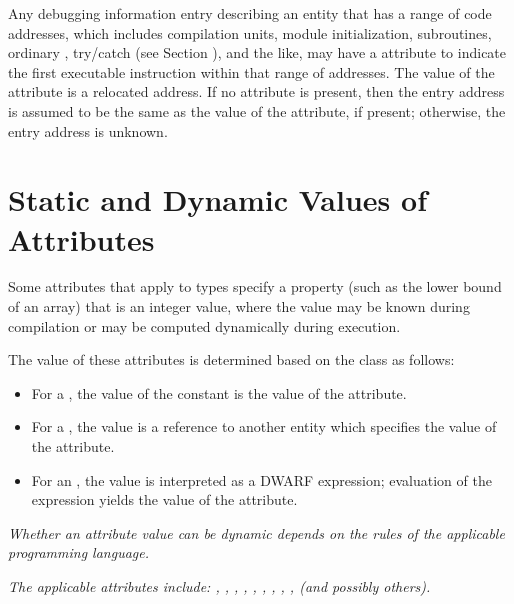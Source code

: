 Any debugging information entry describing an entity that has
a range of code addresses, which includes compilation units,
module initialization, subroutines, 
ordinary , 
try/catch  (see Section ),
and the like, 
may have a  attribute to
indicate the first executable instruction within that range
of addresses. The value of the  attribute is a
relocated address. If no  attribute is present,
then the entry address is assumed to be the same as the
value of the  attribute, if present; otherwise,
the entry address is unknown.

\section{Static and Dynamic Values of Attributes}
\label{chap:staticanddynamicvaluesofattributes}

Some attributes that apply to types specify a property (such
as the lower bound of an array) that is an integer value,
where the value may be known during compilation or may be
computed dynamically during execution.

The value of these
attributes is determined based on the class as follows:
\begin{itemize}
\item For a , the value of the constant is the value of
the attribute.

\item For a , the
value is a reference to another
entity which specifies the value of the attribute.

\item For an , the value is interpreted as a 
DWARF expression; 
evaluation of the expression yields the value of
the attribute.
\end{itemize}

\textit{%
Whether an attribute value can be dynamic depends on the
rules of the applicable programming language.
}

\textit{The applicable attributes include: 
,
, 
, 
,
, 
, 
,
, 
, 
 (and
possibly others).}


